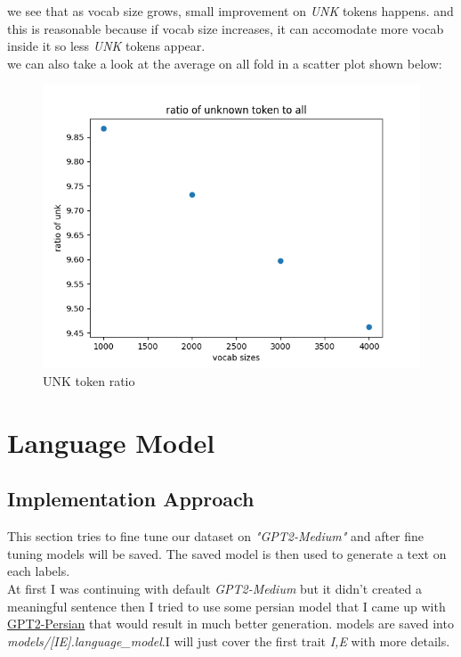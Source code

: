 \documentclass[10pt, a4paper]{article}
\begin{document}
we see that as vocab size grows, small improvement on \textit{UNK} tokens happens. and this is reasonable because if vocab size increases, it can accomodate more vocab inside it so less \textit{UNK} tokens appear.
\\
we can also take a look at the average on all fold in a scatter plot shown below:
\begin{figure}[H]
    \begin{center}
        \includegraphics[width=0.6\linewidth]{../../stats/tokenization/unk-percentage.png}
        \caption{UNK token ratio}
    \end{center}
\end{figure}

\section{Language Model}
\subsection{Implementation Approach}
This section tries to fine tune our dataset on \textit{"GPT2-Medium"} and after fine tuning models will be saved. The saved model is then used to
generate a text on each labels. \\
At first I was continuing with default \textit{GPT2-Medium} but it didn't created a meaningful sentence then I tried to use some persian model that I came up with \href{https://huggingface.co/flax-community/gpt2-medium-persian}{GPT2-Persian} that would result in much better generation.
models are saved into \textit{models/[IE].language\_model}.I will just cover the first trait \textit{I,E} with more details.
\end{document}
